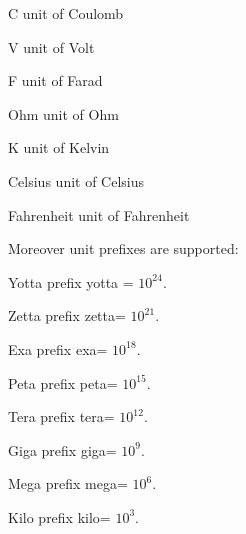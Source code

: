 \begin{datadesc}{C}
unit of Coulomb
\end{datadesc}
\begin{datadesc}{V}
unit of Volt
\end{datadesc}
\begin{datadesc}{F}
 unit of Farad
\end{datadesc}

\begin{datadesc}{Ohm}
 unit of Ohm
\end{datadesc}
\begin{datadesc}{K}
unit of Kelvin
\end{datadesc}
\begin{datadesc}{Celsius}
 unit of Celsius
\end{datadesc}

\begin{datadesc}{Fahrenheit}
unit of Fahrenheit
\end{datadesc}

Moreover unit prefixes are supported:

\begin{datadesc}{Yotta}
prefix yotta = $10^{24}$.

\end{datadesc}

\begin{datadesc}{Zetta}
prefix zetta= $10^{21}$.
\end{datadesc}

\begin{datadesc}{Exa}
prefix exa= $10^{18}$.
 \end{datadesc}

\begin{datadesc}{Peta}
prefix peta= $10^{15}$.
 \end{datadesc}

\begin{datadesc}{Tera}
prefix tera= $10^{12}$.
 \end{datadesc}

\begin{datadesc}{Giga}
prefix giga= $10^9$.
 \end{datadesc}

\begin{datadesc}{Mega}
prefix mega= $10^6$.
 \end{datadesc}

\begin{datadesc}{Kilo}
prefix kilo= $10^3$.
 \end{datadesc}

